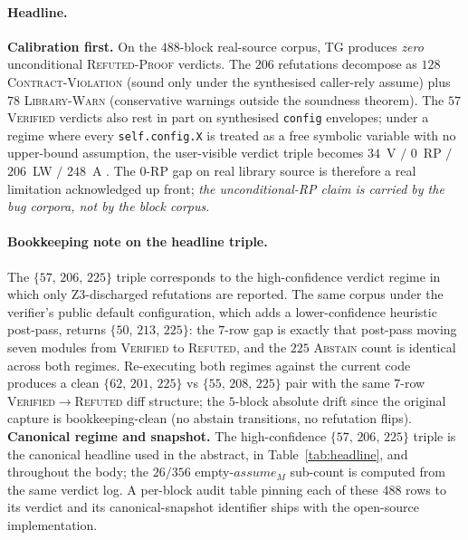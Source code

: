 \paragraph{Headline.}
\textbf{Calibration first.} On the $488$-block real-source corpus,
\textsc{TG} produces \emph{zero} unconditional \textsc{Refuted-Proof}
verdicts. The $206$ refutations decompose as $128$
\textsc{Contract-Violation} (sound only under the synthesised
caller-rely assume) plus $78$ \textsc{Library-Warn} (conservative
warnings outside the soundness theorem). The $57$ \textsc{Verified}
verdicts also rest in part on synthesised \texttt{config}
envelopes; under a regime where every \texttt{self.config.X} is
treated as a free symbolic variable with no upper-bound
assumption, the user-visible verdict triple becomes
$34$~V $/$ $0$~RP $/$ $206$~LW $/$ $248$~A
. The
$0$-RP gap on real library source is therefore a real limitation
acknowledged up front; \emph{the unconditional-RP claim is carried
by the bug corpora, not by the block corpus}.

\paragraph{Bookkeeping note on the headline triple.}
The $\{57,\,206,\,225\}$ triple corresponds to the high-confidence
verdict regime in which only Z3-discharged refutations are reported.
The same corpus under the verifier's public default configuration,
which adds a lower-confidence heuristic post-pass, returns
$\{50,\,213,\,225\}$: the $7$-row gap is exactly that post-pass
moving seven modules from \textsc{Verified} to \textsc{Refuted}, and
the $225$ \textsc{Abstain} count is identical across both regimes.
Re-executing both regimes against the current code produces a
clean $\{62,\,201,\,225\}$ vs $\{55,\,208,\,225\}$ pair with the
same $7$-row \textsc{Verified}$\to$\textsc{Refuted} diff structure;
the $5$-block absolute drift since the original capture is
bookkeeping-clean (no abstain transitions, no refutation flips).
\textbf{Canonical regime and snapshot.} The
high-confidence $\{57,\,206,\,225\}$ triple is the canonical
headline used in the abstract, in Table~\ref{tab:headline}, and
throughout the body; the $26/356$ empty-$\mathit{assume}_M$
sub-count is computed from the same verdict log. A per-block
audit table pinning each of these $488$ rows to its verdict and
its canonical-snapshot identifier ships with the open-source
implementation.

